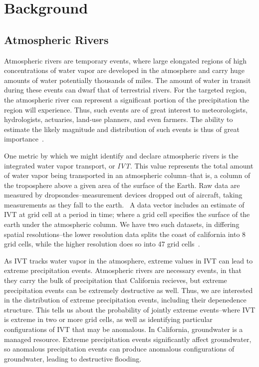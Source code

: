 \section{Background}
\label{sec:background}

\subsection{Atmospheric Rivers}
\label{subsec:ar}
Atmospheric rivers are temporary events, where large elongated regions of high concentrations of
  water vapor are developed in the atmosphere and carry huge amounts of water potentially thousands
  of miles.  The amount of water in transit during these events can dwarf that of terrestrial rivers.
  For the targeted region, the atmospheric river can represent a significant portion of the
  precipitation the region will experience.  Thus, such events are of great interest to meteorologists,
  hydrologists, actuaries, land-use planners, and even farmers.  The ability to estimate the likely magnitude
  and distribution of such events is thus of great importance~\citep{ralph2013,ralph2018}.

One metric by which we might identify and declare atmospheric rivers is the integrated water vapor
  transport, or \emph{IVT}.  This value represents the total amount of water
  vapor being transported in an atmospheric column--that is, a column of the troposphere above a given
  area of the surface of the Earth. Raw data are measured by dropsondes--measurement devices dropped
  out of aircraft, taking measurements as they fall to the earth.~\citep{ralph2017}  A data vector
  includes an estimate of IVT at grid cell at a period in time; where a grid cell specifies the surface
  of the earth under the atmospheric column.  We have two such datasets, in differing spatial
  resolutions--the lower resolution data splits the coast of california into 8 grid cells, while the
  higher resolution does so into 47 grid cells~\citep{guan2015}.

As IVT tracks water vapor in the atmosphere, extreme values in IVT can lead to
  extreme precipitation events.  Atmospheric rivers are necessary events, in that they carry the
  bulk of precipitation that California recieves, but extreme precipitation events can be extremely
  destructive as well.  Thus, we are interested in the distribution of extreme precipitation events,
  including their depenedence structure.  This tells us about the probability of jointly extreme
  events--where IVT is extreme in two or more grid cells, as well as identifying particular
  configurations of IVT that may be anomalous.  In California, groundwater is a managed resource.
  Extreme precipitation events significantly affect groundwater, so anomalous precipitation events
  can produce anomalous configurations of groundwater, leading to destructive flooding.

